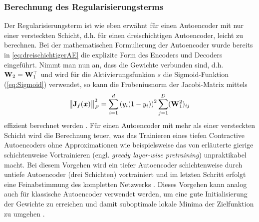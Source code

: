 \subsubsection{Berechnung des Regularisierungsterms}
\label{ch:MethodenDerDimRed:ML:CAE:BerechnungRegTerm}
Der Regularisierungsterm ist wie eben erwähnt für einen Autoencoder mit nur einer versteckten Schicht, d.h. für einen dreischichtigen Autoencoder, leicht zu berechnen. Bei der mathematischen Formulierung der Autoencoder wurde bereits in \eqref{eq:dreischichtigerAE} die explizite Form des Encoders und Decoders eingeführt. Nimmt man nun an, dass die Gewichte verbunden sind, d.h. $\mathbf{W}_2 = \mathbf{W}_1^\top$ und wird für die Aktivierungsfunkion $s$ die Sigmoid-Funktion (\eqref{eq:Sigmoid})
verwendet, so kann die Frobeniusnorm der Jacobi-Matrix mittels
\begin{equation}
	\label{eq:CAE-loss-simple}
	\norm[\big]{\mat{J}_f(\vect{x})}_F^2 = \sum_{i = 1}^d \left( y_i (1 - y_i)\right)^2 \sum_{j = 1}^D (\mat{W}_1^2)_{ij}
\end{equation}
effizient berechnet werden \parencite[4]{Rifai.2011}. Für einen Autoencoder mit mehr als einer versteckten Schicht wird die
Berechnung teuer, was das Trainieren eines tiefen Contractive Autoencoders ohne Approximationen wie
beispielsweise das von \textcite{Bengio.2006} erläuterte gierige schichtenweise Vortrainieren
(engl. \textit{greedy layer-wise pretraining}) unpraktikabel macht. Bei diesem Vorgehen wird ein
tiefer Autoencoder schichtenweise durch untiefe Autoencoder (drei Schichten) vortrainiert und im
letzten Schritt erfolgt eine Feinabstimmung des kompletten Netzwerks \parencite[522]{Goodfellow.2016}. Dieses Vorgehen kann analog auch für klassische Autoencoder verwendet
werden, um eine gute Initialisierung der Gewichte zu erreichen und damit suboptimale lokale Minima
der Zielfunktion zu umgehen \parencite[509]{Goodfellow.2016}.
